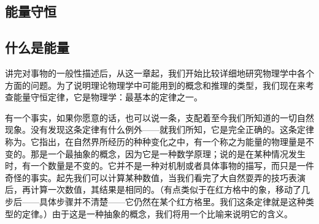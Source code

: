 \documentclass[12pt,oneside]{book}
\begin{document}
\begin{common-format}
\chapter{能量守恒}
\section{什么是能量}
讲完对事物的一般性描述后，从这一章起，我们开始比较详细地研究物理学中各个方面的问题。为了说明理论物理学中可能用到的概念和推理的类型，我们现在来考查能量守恒定律，它是物理学：最基本的定律之一。

有一个事实，如果你愿意的话，也可以说一条，支配着至今我们所知道的一切自然现象。没有发现这条定律有什么例外——就我们所知，它是完全正确的。这条定律称为。它指出，在自然界所经历的种种变化之中，有一个称之为能量的物理量是不变的。那是一个最抽象的概念，因为它是一种数学原理；说的是在某种情况发生时，有一个数量是不变的。它并不是一种对机制或者具体事物的描写，而只是一件奇怪的事实。起先我们可以计算某种数值，当我们看完了大自然耍弄的技巧表演后，再计算一次数值，其结果是相同的。（有点类似于在红方格中的象，移动了几步后——具体步骤并不清楚——它仍然在某个红方格里。我们这条定律就是这种类型的定律。）由于这是一种抽象的概念，我们将用一个比喻来说明它的含义。


\end{common-format}
\end{document}
